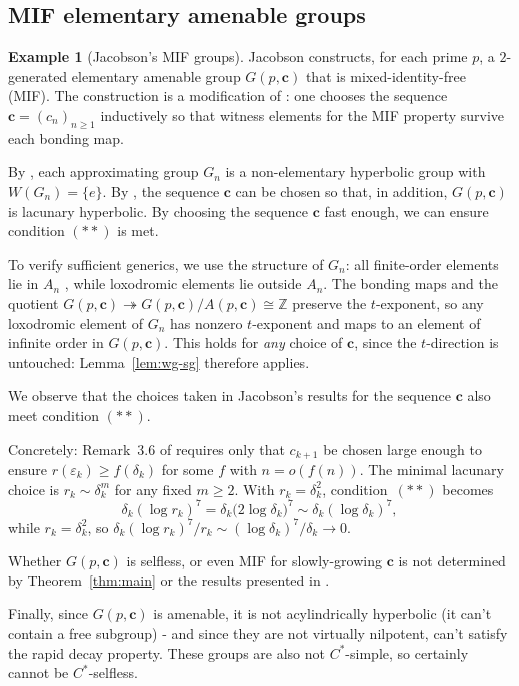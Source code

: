 \documentclass[12pt]{amsart}
\theoremstyle{plain}
\theoremstyle{definition}
\newtheorem{example}[theorem]{Example}
\newcommand{\Cstar}{C^*}
\begin{document}
\subsection{MIF elementary amenable groups}

\begin{example}[Jacobson's MIF groups]\label{ex:jacobson}
Jacobson \cite[Theorem~1.2]{Jac} constructs, for each prime $p$, a
$2$-generated elementary amenable group $G(p,\mathbf{c})$ that is
mixed-identity-free (MIF).
The construction is a modification of \cite{OOS}: one chooses the sequence
$\mathbf{c} = (c_n)_{n \geq 1}$ inductively so that witness elements for the
MIF property survive each bonding map.

By \cite[Lemma~3.5]{Jac}, each approximating group $G_n$ is a non-elementary
hyperbolic group with $W(G_n) = \{e\}$.
By \cite[Remark~3.6]{Jac}, the sequence $\mathbf{c}$ can be chosen so that,
in addition, $G(p,\mathbf{c})$ is lacunary hyperbolic. By choosing the sequence $\mathbf{c}$ fast enough, we can ensure condition $(**)$ is met.

To verify sufficient generics, we use the structure of $G_n$:
all finite-order elements lie in $A_n$ \cite[Proof of Lemma~3.5]{Jac}, while
loxodromic elements lie outside $A_n$.
The bonding maps and the quotient $G(p,\mathbf{c}) \twoheadrightarrow G(p,\mathbf{c})/A(p,\mathbf{c}) \cong \mathbb{Z}$
preserve the $t$-exponent, so any loxodromic element of $G_n$ has nonzero $t$-exponent
and maps to an element of infinite order in $G(p,\mathbf{c})$.
This holds for \emph{any} choice of $\mathbf{c}$, since the $t$-direction is untouched: Lemma~\ref{lem:wg-sg} therefore applies.

We observe that the choices taken in Jacobson's results for the sequence $\mathbf{c}$ also meet condition $(**)$.

Concretely: Remark~3.6 of \cite{Jac} requires only that $c_{k+1}$ be chosen large
enough to ensure $r(\varepsilon_k) \geq f(\delta_k)$ for some $f$ with $n = o(f(n))$.
The minimal lacunary choice is $r_k \sim \delta_k^m$ for any fixed $m \geq 2$.
With $r_k = \delta_k^2$, condition~$(**)$ becomes
\[
  \delta_k(\log r_k)^{7} = \delta_k\bigl(2\log\delta_k\bigr)^{7}
  \sim \delta_k(\log\delta_k)^{7},
\]
while $r_k = \delta_k^2$, so $\delta_k(\log r_k)^{7}/r_k \sim (\log\delta_k)^{7}/\delta_k
\to 0$.

Whether $G(p,\mathbf{c})$ is selfless, or even MIF for slowly-growing $\mathbf{c}$ is not
determined by Theorem~\ref{thm:main} or the results presented in \cite{Jac}. 

Finally, since $G(p,\mathbf{c})$ is amenable, it is not acylindrically hyperbolic (it can't contain a free subgroup) - and since they are not virtually nilpotent, can't satisfy the rapid decay property. These groups are also not $\Cstar$-simple, so certainly cannot be $\Cstar$-selfless.
\end{example}
\end{document}
